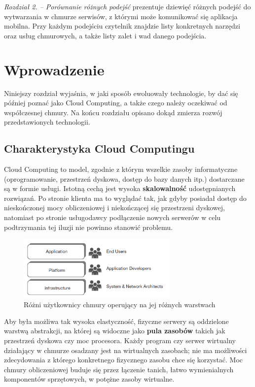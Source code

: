\documentclass[12pt,a4paper,twoside,titlepage,openright]{book}
\begin{document}
\noindent
\textit{Rozdział 2. -- Porównanie różnych podejść} prezentuje dziewięć różnych podejść do wytwarzania w chmurze serwisów, z którymi może komunikować się aplikacja mobilna. Przy każdym podejściu czytelnik znajdzie listy konkretnych narzędzi oraz usług chmurowych, a także listy zalet i wad danego podejścia.


\clearpage{\pagestyle{empty}\cleardoublepage}
\chapter{Wprowadzenie}

Niniejszy rozdział wyjaśnia, w jaki sposób ewoluowały technologie, by dać się później poznać jako Cloud Computing, a także czego należy oczekiwać od współczesnej chmury. Na końcu rozdziału opisano dokąd zmierza rozwój przedstawionych technologii.



\section{Charakterystyka Cloud Computingu}

Cloud Computing to model, zgodnie z którym wszelkie zasoby informatyczne (oprogramowanie, przestrzeń dyskowa, dostęp do bazy danych itp.) dostarczane są w formie usługi. Istotną cechą jest wysoka \textbf{skalowalność} udostępnianych rozwiązań. Po stronie klienta ma to wyglądać tak, jak gdyby posiadał dostęp do nieskończonej mocy obliczeniowej i niekończącej się przestrzeni dyskowej, natomiast po stronie usługodawcy podłączenie nowych serwerów w celu podtrzymania tej iluzji nie powinno stanowić problemu. \cite{ccBiznes}

\begin{figure}[h]
	\centering
			\includegraphics[width=0.7\textwidth]{layers-and-users.png}
		\caption{Różni użytkownicy chmury operujący na jej różnych warstwach \cite{ccCambridge}}
		\label{fig:layers-and-users}
\end{figure}

Aby była możliwa tak wysoka elastyczność, fizyczne serwery są oddzielone warstwą abstrakcji, na której są widoczne jako \textbf{pula zasobów} takich jak przestrzeń dyskowa czy moc procesora. Każdy program czy serwer wirtualny działający w chmurze osadzany jest na wirtualnych zasobach; nie ma możliwości zdecydowania z którego konkretnego fizycznego zasobu chce się korzystać. Moc chmury obliczeniowej buduje się przez łączenie tanich, łatwo wymienialnych komponentów sprzętowych, w potężne zasoby wirtualne. \cite{ccCambridge}
\end{document}
